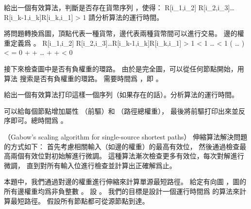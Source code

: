 \startigBase[a]\startitem
給出一個有效算法，判斷是否存在貨幣序列 ，使得：
\startformula
R[i_1,i_2] \cdot R[i_2,i_3]\cdot \ldots \cdot R[i_{k-1},i_k]\cdot R[i_k,i_1] > 1
\stopformula
請分析算法的運行時間。
\stopitem\stopigBase

\startANSWER
將問題轉換爲圖，頂點代表一種貨幣，邊代表兩種貨幣間可以進行交易。
邊的權重定義爲 。
\startformula\startmathalignment
\NC \NC R[i_1,i_2] \times R[i_2,i_3]\times \ldots \times R[i_{k-1},i_k]\times R[i_k,i_1] > 1 \NR
\NC \NC {} < 1 \NR
\NC \NC {} \times {} \times \ldots
	\times {} \times {} < 1 \NR
\NC \NC \log\left( \times {} \times \ldots
	\times {} \times {}\right) <  = 0 \NR
\NC \NC \log{} + \log{} + \ldots
	+ \log{} + \log{} < 0\NR
\stopmathalignment\stopformula

接下來檢查圖中是否有負權重的環路。
由於是完全圖，可以從任何節點開始，用算法  搜索是否有負權重的環路。
需要時間爲 ，即 。
\stopANSWER

\startigBase[continue]\startitem
給出一個有效算法打印這樣一個序列（如果存在的話）。分析算法的運行時間。
\stopitem\stopigBase

\startANSWER
可以給每個節點增加屬性  （前驅）和  （路徑總權重），
最後將前驅打印出來並反序即可。總時間爲 。
\stopANSWER

\stopPROBLEM

\startPROBLEM
（Gabow’s scaling algorithm for single-source shortest paths）
伸縮算法解決問題的方式如下：
首先考慮相關輸入（如邊的權重）的最高有效位，
然後通過檢查最高兩個有效位對初始解進行微調。
這種算法漸次檢查更多有效位，每次對解進行微調，
直到對所有輸入位進行檢查並計算出正確解爲止。

本題中，我們通過對邊的權重進行伸縮來計算單源最短路徑。
給定有向圖 ，圖的所有邊權重均爲非負整數 \m{\omega}。
設 。
我們的目標是設計一個運行時間爲  的算法來計算最短路徑。
假設所有節點都可從源節點到達。

